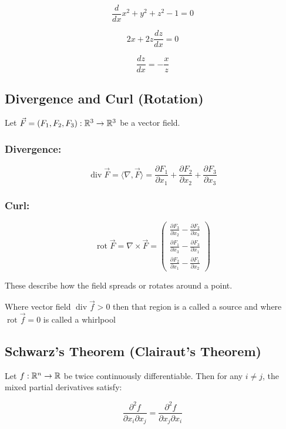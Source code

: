 \[
    \frac{d}{dx} x^2 + y^2 + z^2  -1 = 0
\]

\[
    2x + 2z \frac{dz}{dx}  = 0
\]

\[
    \frac{dz}{dx} = - \frac{x}{z}
\]

\subsection{Divergence and Curl (Rotation)}

Let \( \vec{F} = (F_1, F_2, F_3) : \mathbb{R}^3 \to \mathbb{R}^3 \) be a vector field.

\subsubsection{Divergence:}

\[
    \operatorname{div} \vec{F} = \langle\nabla, \vec{F}\rangle = \frac{\partial F_1}{\partial x_1} + \frac{\partial F_2}{\partial x_2} + \frac{\partial F_3}{\partial x_3}
\]

\subsubsection{Curl:}

\[
    \operatorname{rot} \vec{F} = \nabla \times \vec{F} = \begin{pmatrix}
    \frac{\partial F_3}{\partial x_2} - \frac{\partial F_2}{\partial x_3} \\
    \frac{\partial F_1}{\partial x_3} - \frac{\partial F_3}{\partial x_1} \\
    \frac{\partial F_2}{\partial x_1} - \frac{\partial F_1}{\partial x_2}
    \end{pmatrix}
\]

These describe how the field spreads or rotates around a point.

Where vector field \( \operatorname{div}\vec{f} > 0\) then that region is a called a source
and where \(\operatorname{rot}\vec{f} = 0\) is called a whirlpool

\subsection{Schwarz’s Theorem (Clairaut’s Theorem)}

Let \( f : \mathbb{R}^n \to \mathbb{R} \) be twice continuously differentiable. Then for any \( i \ne j \), the mixed partial derivatives satisfy:

\[
    \frac{\partial^2 f}{\partial x_i \partial x_j} = \frac{\partial^2 f}{\partial x_j \partial x_i}
\]

